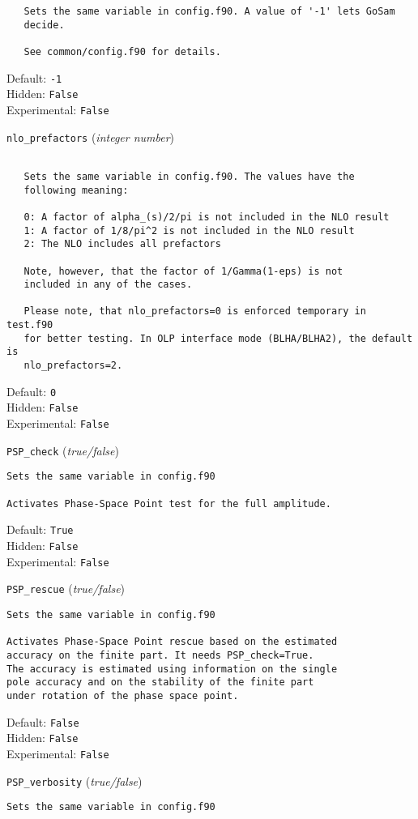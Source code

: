 \begin{basedescript}{\desclabelstyle{\pushlabel}}
\begin{verbatim}
   Sets the same variable in config.f90. A value of '-1' lets GoSam
   decide.

   See common/config.f90 for details.
\end{verbatim}
Default: \verb|-1|
\\Hidden: \verb|False|
\\Experimental: \verb|False|
\\\item[\colorbox{gray!30}{\texttt{nlo\_prefactors}}] (\textit{integer number})
\begin{verbatim}

   Sets the same variable in config.f90. The values have the
   following meaning:

   0: A factor of alpha_(s)/2/pi is not included in the NLO result
   1: A factor of 1/8/pi^2 is not included in the NLO result
   2: The NLO includes all prefactors

   Note, however, that the factor of 1/Gamma(1-eps) is not
   included in any of the cases.

   Please note, that nlo_prefactors=0 is enforced temporary in test.f90
   for better testing. In OLP interface mode (BLHA/BLHA2), the default is
   nlo_prefactors=2.
\end{verbatim}
Default: \verb|0|
\\Hidden: \verb|False|
\\Experimental: \verb|False|
\\\item[\colorbox{gray!30}{\texttt{PSP\_check}}] (\textit{true/false})
\begin{verbatim}
Sets the same variable in config.f90

Activates Phase-Space Point test for the full amplitude.
\end{verbatim}
Default: \verb|True|
\\Hidden: \verb|False|
\\Experimental: \verb|False|
\\\item[\colorbox{gray!30}{\texttt{PSP\_rescue}}] (\textit{true/false})
\begin{verbatim}
Sets the same variable in config.f90

Activates Phase-Space Point rescue based on the estimated
accuracy on the finite part. It needs PSP_check=True.
The accuracy is estimated using information on the single
pole accuracy and on the stability of the finite part
under rotation of the phase space point.
\end{verbatim}
Default: \verb|False|
\\Hidden: \verb|False|
\\Experimental: \verb|False|
\\\item[\colorbox{gray!30}{\texttt{PSP\_verbosity}}] (\textit{true/false})
\begin{verbatim}
Sets the same variable in config.f90


\end{verbatim}
\end{basedescript}
